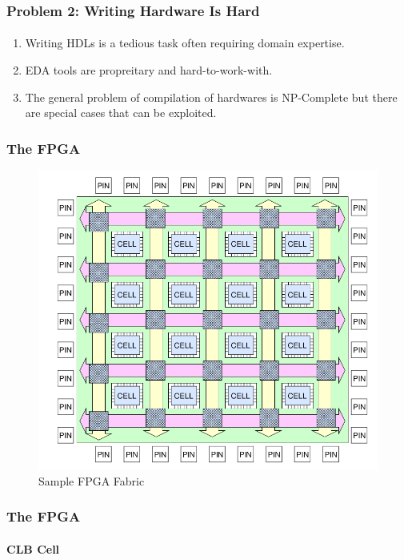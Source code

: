 \documentclass{beamer}
\begin{document}
{ 
\begin{frame}[fragile]
  \frametitle{Problem 2: Writing Hardware Is Hard}
  \framesubtitle{}
  \begin{enumerate}
    \item Writing HDLs is a tedious task often requiring domain expertise.
    \item EDA tools are propreitary and hard-to-work-with.
    \item The general problem of compilation of hardwares is NP-Complete but
      there are special cases that can be exploited.
  \end{enumerate}
\end{frame}


\begin{frame}[fragile]
  \frametitle{The FPGA}
  \begin{figure}
    \centering
    \includegraphics[width=0.5\linewidth]{images/fpga_fabric.png}
    \caption{Sample FPGA Fabric\cite{brown92}}
    \label{exa-fabric}
  \end{figure}
\end{frame}

\begin{frame}[fragile]
   \frametitle{The FPGA}
   \framesubtitle{CLB Cell}


\end{frame}}
\end{document}
